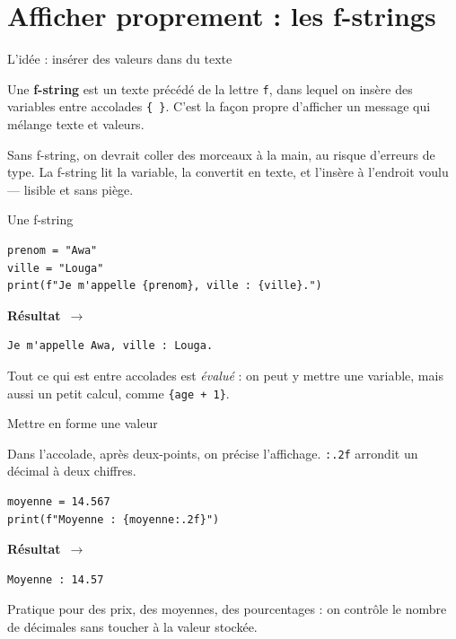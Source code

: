 \documentclass[aspectratio=169,11pt]{beamer}
\newcommand{\resultat}{{\scriptsize\textbf{R\'esultat}~$\rightarrow$}\par\vspace{1pt}}
\begin{document}
\section{Afficher proprement : les f-strings}

\begin{frame}{L'idée : insérer des valeurs dans du texte}
\begin{ucaddef}
{\small Une \textbf{f-string} est un texte précédé de la lettre \texttt{f}, dans lequel on insère des variables entre accolades \texttt{\{ \}}. C'est la façon propre d'afficher un message qui mélange texte et valeurs.}
\end{ucaddef}
{\small Sans f-string, on devrait coller des morceaux à la main, au risque d'erreurs de type. La f-string lit la variable, la convertit en texte, et l'insère à l'endroit voulu — lisible et sans piège.}
\end{frame}

\begin{frame}[fragile]{Une f-string}
\begin{lstlisting}
prenom = "Awa"
ville = "Louga"
print(f"Je m'appelle {prenom}, ville : {ville}.")
\end{lstlisting}
\resultat
\begin{lstlisting}[style=out]
Je m'appelle Awa, ville : Louga.
\end{lstlisting}
{\small Tout ce qui est entre accolades est \emph{évalué} : on peut y mettre une variable, mais aussi un petit calcul, comme \texttt{\{age + 1\}}.}
\end{frame}

\begin{frame}[fragile]{Mettre en forme une valeur}
\begin{ucadex}
{\small Dans l'accolade, après deux-points, on précise l'affichage. \texttt{:.2f} arrondit un décimal à deux chiffres.}
\end{ucadex}
\begin{lstlisting}
moyenne = 14.567
print(f"Moyenne : {moyenne:.2f}")
\end{lstlisting}
\resultat
\begin{lstlisting}[style=out]
Moyenne : 14.57
\end{lstlisting}
{\small Pratique pour des prix, des moyennes, des pourcentages : on contrôle le nombre de décimales sans toucher à la valeur stockée.}
\end{frame}
\end{document}
